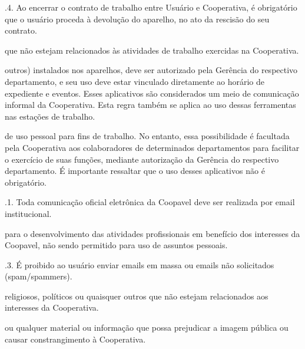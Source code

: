 \documentclass[a4paper,10pt,portuges]{sphinxmanual}
\begin{document}
.4. Ao encerrar o contrato de trabalho entre Usuário e Cooperativa, é obrigatório que o usuário proceda à devolução
do aparelho, no ato da rescisão do seu contrato.
\begin{description}
\sphinxAtStartPar
que não estejam relacionados às atividades de trabalho exercidas na Cooperativa.

\sphinxAtStartPar
outros) instalados nos aparelhos, deve ser autorizado pela Gerência do respectivo departamento, e seu uso deve estar
vinculado diretamente ao horário de expediente e eventos. Esses aplicativos são considerados um meio de comunicação
informal da Cooperativa. Esta regra também se aplica ao uso dessas ferramentas nas estações de trabalho.

\sphinxAtStartPar
de uso pessoal para fins de trabalho. No entanto, essa possibilidade é facultada pela Cooperativa aos colaboradores de determinados departamentos para facilitar o exercício de suas funções, mediante autorização da Gerência do respectivo departamento. É importante ressaltar que o uso desses aplicativos não é obrigatório.

\end{description}

.1. Toda comunicação oficial eletrônica da Coopavel deve ser realizada por e\sphinxhyphen{}mail institucional.
\begin{description}
\sphinxAtStartPar
para o desenvolvimento das atividades profissionais em benefício dos interesses da Coopavel, não sendo permitido
para uso de assuntos pessoais.

\end{description}

.3. É proibido ao usuário enviar e\sphinxhyphen{}mails em massa ou e\sphinxhyphen{}mails não solicitados (spam/spammers).
\begin{description}
\sphinxAtStartPar
religiosos, políticos ou quaisquer outros que não estejam relacionados aos interesses da Cooperativa.

\sphinxAtStartPar
ou qualquer material ou informação que possa prejudicar a imagem pública ou causar constrangimento à Cooperativa.

\end{description}
\end{document}
